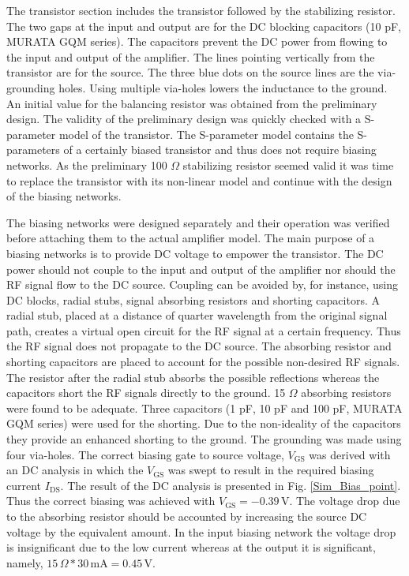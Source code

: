 \documentclass[a4paper, 12pt]{article}
\begin{document}
The transistor section includes the transistor followed by the stabilizing resistor. 
The two gaps at the input and output are for the DC blocking capacitors (10 pF, MURATA GQM series). 
The capacitors prevent the DC power from flowing to the input and output of the amplifier. 
The lines pointing vertically from the transistor are for the source. The three blue dots
on the source lines are the via-grounding holes. Using multiple via-holes lowers the inductance 
to the ground. An initial value for the balancing resistor was obtained from the preliminary 
design. The validity of the preliminary design was quickly checked with a S-parameter model 
of the transistor. The S-parameter model contains the S-parameters of a certainly biased 
transistor and thus does not require biasing networks. As the preliminary 100 $\Omega$ 
stabilizing resistor seemed valid it was time to replace the transistor with its non-linear 
model and continue with the design of the biasing networks. 

The biasing networks were designed separately and their operation was verified before attaching 
them to the actual amplifier model. The main purpose of a biasing networks is to provide DC 
voltage to empower the transistor. The DC power should not couple to the input and output of 
the amplifier nor should the RF signal flow to the DC source. Coupling can be avoided by, for 
instance, using DC blocks, radial stubs, signal absorbing resistors and shorting capacitors. 
A radial stub, placed at a distance of quarter wavelength from the original signal path, creates 
a virtual open circuit for the RF signal at a certain frequency. Thus the RF signal does not 
propagate to the DC source. The absorbing resistor and shorting capacitors are placed to account 
for the possible non-desired RF signals. The  resistor after the radial stub absorbs the possible 
reflections whereas the capacitors short the RF signals directly to the ground. 15 $\Omega$ 
absorbing resistors were found to be adequate. Three capacitors (1 pF, 10 pF and 100 pF, MURATA 
GQM series) were used for the shorting. Due to the non-ideality of the capacitors they provide 
an enhanced shorting to the ground. The grounding was made using four via-holes. The correct 
biasing gate to source voltage, $V_{\mathrm{GS}}$ was derived with an DC analysis in which the 
$V_{\mathrm{GS}}$ was swept to result in the required biasing current $I_{\mathrm{DS}}$. The 
result of the DC analysis is presented in Fig. \ref{Sim_Bias_point}. Thus the correct biasing 
was achieved with $V_{\mathrm{GS}}=-0.39 \,\mathrm{V}$. The voltage drop due to the absorbing 
resistor should be accounted by increasing the source DC voltage by the equivalent amount. In 
the input biasing network the voltage drop is insignificant due to the low current whereas at 
the output it is significant, namely, $15 \, \Omega * 30 \, \mathrm{mA} = 0.45 \,\mathrm{V}$.
\end{document}

